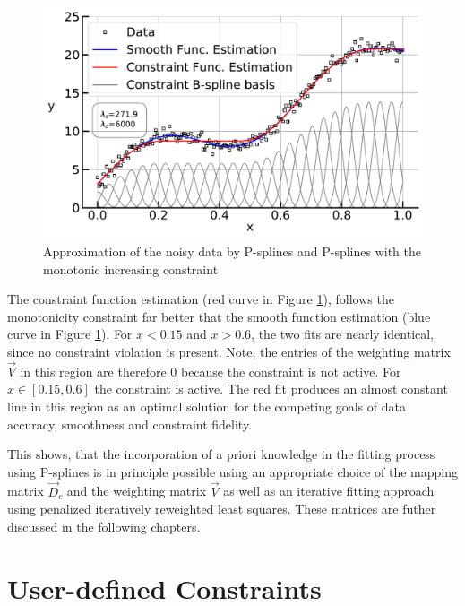 \begin{figure}[H]
	\centering
	\includegraphics[width=\linewidth]{thesisplots/inc_spline.pdf}
	\caption{Approximation of the noisy data by P-splines and P-splines with the monotonic increasing constraint}
	\label{fig:incspline}
\end{figure}	

The constraint function estimation (red curve in Figure \ref{fig:incspline}), follows the monotonicity constraint far better that the smooth function estimation (blue curve in Figure \ref{fig:incspline}). For $x < 0.15$ and $x > 0.6$, the two fits are nearly identical, since no constraint violation is present. Note, the entries of the weighting matrix $\vec{V}$ in this region are therefore $0$ because the constraint is not active. For $x \in [0.15, 0.6]$ the constraint is active. The red fit produces an almost constant line in this region as an optimal solution for the competing goals of data accuracy, smoothness and constraint fidelity.

This shows, that the incorporation of a priori knowledge in the fitting process using P-splines is in principle possible using an appropriate choice of the mapping matrix $\vec{D}_c$ and the weighting matrix $\vec{V}$ as well as an iterative fitting approach using penalized iteratively reweighted least squares. These matrices are futher discussed in the following chapters.

\section{User-defined Constraints} \label{sec:user-defined-constraints}

